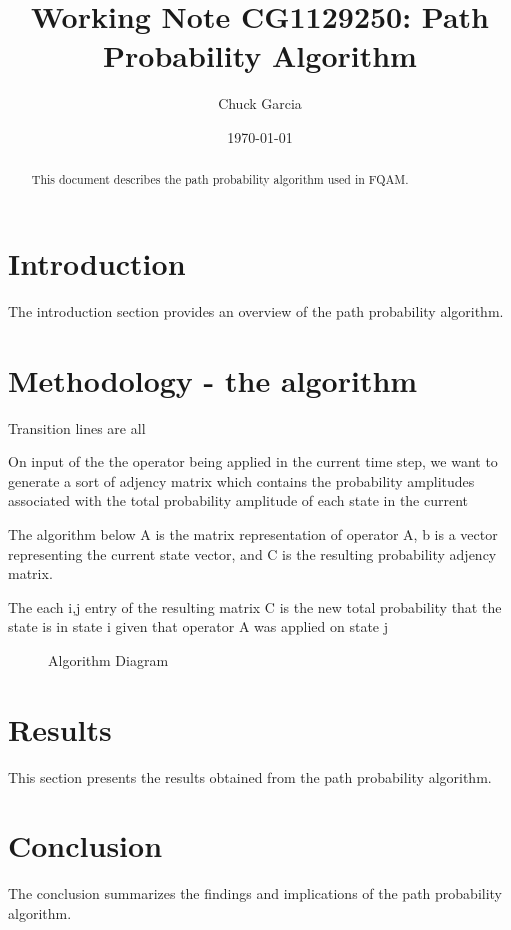 \documentclass[12pt]{article}
\title{Working Note CG1129250: Path Probability Algorithm}
\author{Chuck Garcia}
\date{\today}
\begin{document}
\maketitle

\begin{abstract}

This document describes the path probability algorithm used in FQAM.

\end{abstract}

\section{Introduction}
The introduction section provides an overview of the path probability algorithm.

\section{Methodology - the algorithm}

Transition lines are all 

On input of the the operator being applied in the current time step, we want to generate a sort of adjency matrix which contains the probability amplitudes associated with the total probability amplitude of each state in the current

The algorithm below A is the matrix representation of operator A, b is a vector representing the current state vector, and C is the resulting probability adjency matrix.

The each i,j entry of the resulting matrix C is the new total probability that the state is in state i given that operator A was applied on state j


\begin{figure}[h]
  \begin{center}
      \FlaAlgorithm
  \end{center}
  \caption{Algorithm Diagram}
\end{figure}

\section{Results}
This section presents the results obtained from the path probability algorithm.

\section{Conclusion}
The conclusion summarizes the findings and implications of the path probability algorithm.
\end{document}
